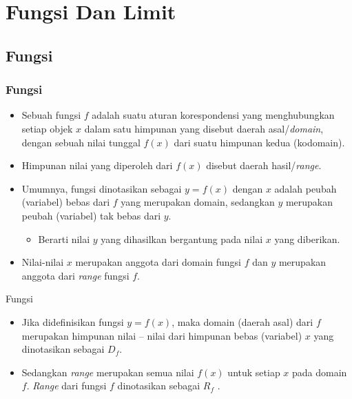 \documentclass[pdflatex,compress,mathserif]{beamer}
\begin{document}
\section{Fungsi Dan Limit}

	\subsection{Fungsi}
	
		\begin{frame}
			\frametitle{Fungsi}
			\begin{itemize}
				\item Sebuah fungsi $ f $ adalah suatu aturan korespondensi yang menghubungkan setiap objek $ x $ dalam satu himpunan yang disebut daerah asal/\textit{domain}, dengan sebuah nilai tunggal $ f(x) $ dari suatu himpunan kedua (kodomain).
				\item Himpunan nilai yang diperoleh dari $ f(x) $ disebut daerah hasil/\textit{range}.
				\item Umumnya, fungsi dinotasikan sebagai $ y = f(x) $ dengan $ x $ adalah peubah (variabel) bebas dari $ f $ yang merupakan domain, sedangkan $ y $ merupakan peubah (variabel) tak bebas dari $ y $.
				\begin{itemize}
					\item Berarti nilai $ y $ yang dihasilkan bergantung pada nilai $ x $ yang diberikan.
				\end{itemize}
				\item Nilai-nilai $ x $ merupakan anggota dari domain fungsi $ f $ dan $ y $ merupakan anggota dari \textit{range} fungsi $ f $.
			\end{itemize}
		\end{frame}
	
		\begin{frame}{Fungsi}
			\begin{itemize}
				\item Jika didefinisikan fungsi $ y = f(x) $, maka domain (daerah asal) dari $ f $ merupakan himpunan nilai – nilai dari himpunan bebas (variabel) $ x $ yang dinotasikan sebagai $ D_f $.
				\item Sedangkan \textit{range} merupakan semua nilai $ f(x) $ untuk setiap $ x $ pada domain $ f $. \textit{Range} dari fungsi $ f $ dinotasikan sebagai $ R_f $ .
			\end{itemize}
		\end{frame}
	
\end{document}

